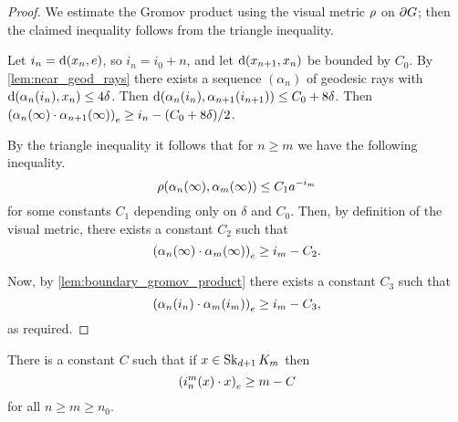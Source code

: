 \documentclass[a4paper]{article}
\begin{document}
\begin{proof}
  We estimate the Gromov product using the visual metric $\vdistance$ on 
  $\boundary G$; then the claimed inequality follows from the triangle 
  inequality. 
  
  Let $i_n = \dist(x_n, e)$, so $i_n = i_0 + n$, and let 
  $\dist(x_{n+1},x_n)$ be bounded by $C_0$. By 
  \cref{lem:near_geod_rays} there exists a sequence $(\alpha_n)$ of 
  geodesic rays with $\dist(\alpha_n(i_n), x_n) \leq 4\delta$. Then 
  $\dist(\alpha_n(i_n), \alpha_{n+1}(i_{n+1})) \leq C_0 + 8\delta$. Then 
  $\gromov{e}{\alpha_n(\infty)}{ \alpha_{n+1}(\infty)} \geq i_n - (C_0 + 
  8\delta)/2$.

  By the triangle inequality it follows that for $n\geq m$ we have the following 
  inequality.
  \begin{equation*}
    \vdistance(\alpha_n(\infty), \alpha_m(\infty)) \leq C_1 a^{-i_m}
  \end{equation*}
  for some constants $C_1$ depending only on $\delta$ and $C_0$. Then, by
  definition of the visual metric, there exists a constant $C_2$ such that
  \begin{equation*}
    \gromov{e}{\alpha_n(\infty)}{\alpha_m(\infty)} \geq i_m - C_2.
  \end{equation*}

  Now, by \cref{lem:boundary_gromov_product} there exists a constant $C_3$ such
  that
  \begin{equation*}
    \gromov{e}{\alpha_n(i_n)}{\alpha_m(i_m)} \geq i_m - C_3,
  \end{equation*}
  as required.
\end{proof}

\begin{lemma}\label{lem:linearproduct}
  There is a constant $C$ such that if $x \in \Skel_{d+1} K_m$ then
  \begin{equation*}
    \gromov{e}{i^m_n(x)}{x} \geq m - C
  \end{equation*}
  for all $n\geq m\geq n_0$.
\end{lemma}
\end{document}
